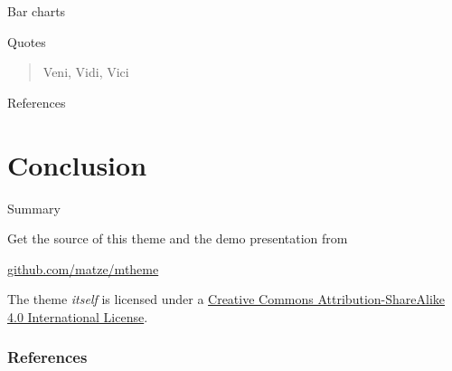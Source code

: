 \documentclass[10pt]{beamer}
\begin{document}
\begin{frame}{Bar charts}
  \begin{figure}
  \end{figure}
\end{frame}
\begin{frame}{Quotes}
  \begin{quote}
    Veni, Vidi, Vici
  \end{quote}
\end{frame}

\begin{frame}{References}
\end{frame}

\section{Conclusion}

\begin{frame}{Summary}

  Get the source of this theme and the demo presentation from

  \begin{center}\url{github.com/matze/mtheme}\end{center}

  The theme \emph{itself} is licensed under a
  \href{http://creativecommons.org/licenses/by-sa/4.0/}{Creative Commons
  Attribution-ShareAlike 4.0 International License}.

  \begin{center}\ccbysa\end{center}

\end{frame}


\begin{frame}[allowframebreaks]

  \frametitle{References}

  
  

\end{frame}
\end{document}
